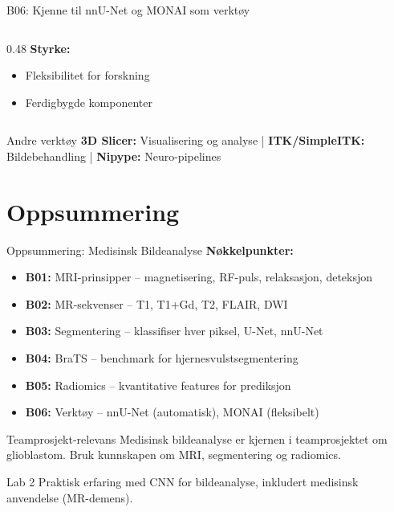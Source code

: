 \documentclass[aspectratio=169, 10pt]{beamer}
\begin{document}
\begin{frame}{B06: Kjenne til nnU-Net og MONAI som verktøy}
\begin{columns}[T]
\begin{column}{0.48\textwidth}
            \vspace{0.3cm}
            \textbf{Styrke:}
            \begin{itemize}
                \item Fleksibilitet for forskning
                \item Ferdigbygde komponenter
            \end{itemize}
        \end{column}
    \end{columns}
    
    \vspace{0.2cm}
    \begin{block}{\footnotesize Andre verktøy}
        \footnotesize \textbf{3D Slicer:} Visualisering og analyse | \textbf{ITK/SimpleITK:} Bildebehandling | \textbf{Nipype:} Neuro-pipelines
    \end{block}
\end{frame}

\section*{Oppsummering}

\begin{frame}{Oppsummering: Medisinsk Bildeanalyse}
    \textbf{Nøkkelpunkter:}
    \begin{itemize}
        \item \textbf{B01:} MRI-prinsipper -- magnetisering, RF-puls, relaksasjon, deteksjon
        \item \textbf{B02:} MR-sekvenser -- T1, T1+Gd, T2, FLAIR, DWI
        \item \textbf{B03:} Segmentering -- klassifiser hver piksel, U-Net, nnU-Net
        \item \textbf{B04:} BraTS -- benchmark for hjernesvulstsegmentering
        \item \textbf{B05:} Radiomics -- kvantitative features for prediksjon
        \item \textbf{B06:} Verktøy -- nnU-Net (automatisk), MONAI (fleksibelt)
    \end{itemize}

    \vspace{0.2cm}
    \begin{block}{\footnotesize Teamprosjekt-relevans}
        \footnotesize Medisinsk bildeanalyse er kjernen i teamprosjektet om glioblastom. Bruk kunnskapen om MRI, segmentering og radiomics.
    \end{block}

    \begin{block}{\footnotesize Lab 2}
        \footnotesize Praktisk erfaring med CNN for bildeanalyse, inkludert medisinsk anvendelse (MR-demens).
    \end{block}
\end{frame}
\end{document}

